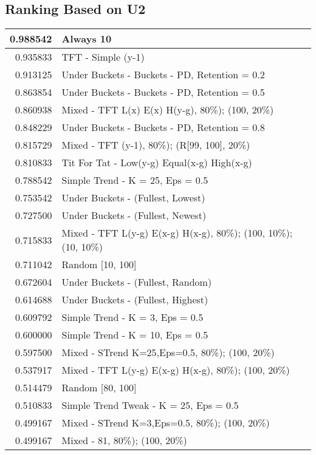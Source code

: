 \begin{table}[!hbtp]
\subsection{Ranking Based on U2}
\begin{footnotesize}
\begin{tabular}{|r|l|}\hline  \label{U3results}
0.988542 & Always 10\\ \hline
0.935833 & TFT - Simple (y-1)\\ \hline
0.913125 & Under Buckets - Buckets - PD, Retention = 0.2\\ \hline
0.863854 & Under Buckets - Buckets - PD, Retention = 0.5\\ \hline
0.860938 & Mixed - {TFT L(x) E(x) H(y-g), 80\%); (100, 20\%)}\\ \hline
0.848229 & Under Buckets - Buckets - PD, Retention = 0.8\\ \hline
0.815729 & Mixed - {TFT (y-1), 80\%); (R[99, 100], 20\%)}\\ \hline
0.810833 & Tit For Tat - Low(y-g) Equal(x-g) High(x-g)\\ \hline
0.788542 & Simple Trend - K = 25, Eps = 0.5\\ \hline
0.753542 & Under Buckets - (Fullest, Lowest)\\ \hline
0.727500 & Under Buckets - (Fullest, Newest)\\ \hline
0.715833 & Mixed - {TFT L(y-g) E(x-g) H(x-g), 80\%); (100, 10\%); (10, 10\%)}\\ \hline
0.711042 & Random [10, 100]\\ \hline
0.672604 & Under Buckets - (Fullest, Random)\\ \hline
0.614688 & Under Buckets - (Fullest, Highest)\\ \hline
0.609792 & Simple Trend - K = 3, Eps = 0.5\\ \hline
0.600000 & Simple Trend - K = 10, Eps = 0.5\\ \hline
0.597500 & Mixed - {STrend K=25,Eps=0.5, 80\%); (100, 20\%)}\\ \hline
0.537917 & Mixed - {TFT L(y-g) E(x-g) H(x-g), 80\%); (100, 20\%)}\\ \hline
0.514479 & Random [80, 100]\\ \hline
0.510833 & Simple Trend Tweak - K = 25, Eps = 0.5\\ \hline
0.499167 & Mixed - {STrend K=3,Eps=0.5, 80\%); (100, 20\%)}\\ \hline
0.499167 & Mixed - {81, 80\%); (100, 20\%)}\\ \hline

\end{tabular}
\end{footnotesize}
\end{table}
